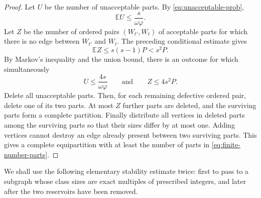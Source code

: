\documentclass{article}
\newtheorem{lem}[thm]{Lemma}
\begin{document}
\begin{proof}
Let $U$ be the number of unacceptable parts.  By \eqref{eq:unacceptable-prob},
\[
 \mathbb E U\le \frac{s}{\omega\varphi}.
\]
Let $Z$ be the number of ordered pairs $(W_{t'},W_t)$ of acceptable parts for which there is no edge between $W_{t'}$ and $W_t$.  The preceding conditional estimate gives
\[
 \mathbb E Z\le s(s-1)P<s^2P.
\]
By Markov's inequality and the union bound, there is an outcome for which simultaneously
\[
 U\le\frac{4s}{\omega\varphi}
 \qquad\text{and}\qquad
 Z\le4s^2P.
\]
Delete all unacceptable parts.  Then, for each remaining defective ordered pair, delete one of its two parts.  At most $Z$ further parts are deleted, and the surviving parts form a complete partition.  Finally distribute all vertices in deleted parts among the surviving parts so that their sizes differ by at most one.  Adding vertices cannot destroy an edge already present between two surviving parts.  This gives a complete equipartition with at least the number of parts in \eqref{eq:finite-number-parts}.
\end{proof}

We shall use the following elementary stability estimate twice: first to pass to a subgraph whose class sizes are exact multiples of prescribed integers, and later after the two reservoirs have been removed.

\end{document}
